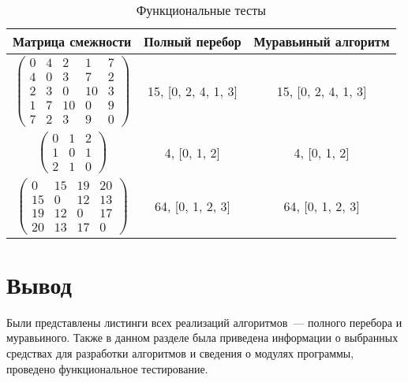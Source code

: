 \begin{table}[H]
	\caption{Функциональные тесты}
	\label{tbl:func-tests}
	\centering
	\begin{tabular}{|c|c|c|}
		\hline
		Матрица смежности & Полный перебор & Муравьиный алгоритм \\ \hline
		$ \begin{pmatrix}
			0 &  4 &  2 &  1 & 7 \\
			4 &  0 &  3 &  7 & 2 \\
			2 &  3 &  0 & 10 & 3 \\
			1 &  7 & 10 &  0 & 9 \\
			7 &  2 &  3 &  9 & 0
		\end{pmatrix}$ &
		15, [0, 2, 4, 1, 3] &
		15, [0, 2, 4, 1, 3] \\ \hline
		$ \begin{pmatrix}
			0 & 1 & 2 \\
			1 & 0 & 1 \\
			2 & 1 & 0	
		\end{pmatrix}$ &
		4, [0, 1, 2] &
		4, [0, 1, 2] \\ \hline
		$ \begin{pmatrix}
			0 & 15 & 19 & 20 \\
			15 &  0 & 12 & 13 \\
			19 & 12 &  0 & 17 \\
			20 & 13 & 17 &  0
		\end{pmatrix}$ &
		64, [0, 1, 2, 3] &
		64, [0, 1, 2, 3] \\ \hline
	\end{tabular}
\end{table}

\section*{Вывод}

Были представлены листинги всех реализаций алгоритмов~--- полного перебора и муравьиного.
Также в данном разделе была приведена информации о выбранных средствах для разработки алгоритмов и сведения о модулях программы, проведено функциональное тестирование.